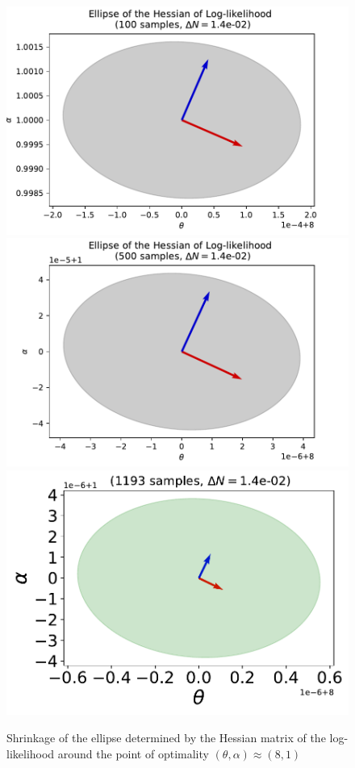 \documentclass[10pt,twocolumn,letterpaper]{article}
\begin{document}
\begin{figure}[t]
\begin{center}
   \includegraphics[width=0.5\linewidth]{ellipse100_samples_dN=14e-02.pdf}
   \includegraphics[width=0.5\linewidth]{ellipse500_samples_dN=14e-02.pdf}
   \includegraphics[width=0.5\linewidth]{ellipse1193_samples_dN=14e-02.pdf}
\end{center}
   \caption{Shrinkage of the ellipse determined by the Hessian matrix of the log-likelihood around the point of optimality $(\theta, \alpha)\approx (8,1)$}
\label{ellipse_drawing}
\end{figure}
 
\end{document}
